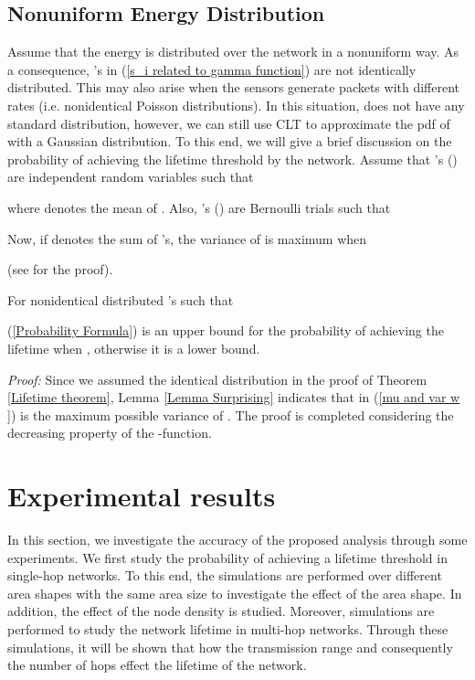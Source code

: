 \documentclass[conference]{IEEEtran}
\begin{document}
\subsection{Nonuniform Energy Distribution}
Assume that the energy is distributed over the network in a
nonuniform way. As a consequence, 's in (\ref{s_i related to
gamma function}) are not identically distributed. This may also
arise when the sensors generate packets with different rates (i.e.
nonidentical Poisson distributions). In this situation,  does not
have any standard distribution, however, we can still use CLT to
approximate the pdf of  with a Gaussian distribution. To this
end, we will give a brief discussion on the probability of achieving
the lifetime threshold by the network.
\lem\label{Lemma Surprising} Assume that 's ()
are  independent random variables such that

where  denotes the mean of . Also, 's () are  Bernoulli trials such that

Now, if  denotes the sum of 's, the variance of  is
maximum when

(see \cite{Nedleman_Bernoulli_Statistician} for the proof).

\corol \label{Corollary} For nonidentical distributed 's such
that

(\ref{Probability Formula}) is an upper bound for the probability of
achieving the lifetime when , otherwise it is a
lower bound.

\textit{Proof:} Since we assumed the identical distribution in the
proof of Theorem \ref{Lifetime theorem}, Lemma \ref{Lemma
Surprising} indicates that  in (\ref{mu and var w }) is
the maximum possible variance of . The proof is completed
considering the decreasing property of the -function. \hfill


\section{Experimental results}\label{Section Simulations}
In this section, we investigate the accuracy of the proposed
analysis through some experiments. We first study the probability of
achieving a lifetime threshold in single-hop networks. To this end,
the simulations are performed over different area shapes with the
same area size to investigate the effect of the area shape. In
addition, the effect of the node density is studied. Moreover,
simulations are performed to study the network lifetime in multi-hop
networks. Through these simulations, it will be shown that how the
transmission range and consequently the number of hops effect the
lifetime of the network.
\end{document}
